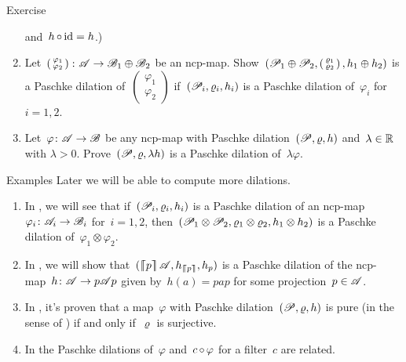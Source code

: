 \begin{parsec}
\begin{point}{Exercise}
\begin{enumerate}
and~$h \mathop{\circ} \operatorname{id} = h$.)
\item
    Let~$ \left(\begin{smallmatrix} \varphi_1 \\ \varphi_2
    \end{smallmatrix}\right) \colon \mathscr{A} \to \mathscr{B}_1 \oplus \mathscr{B}_2$
    be an ncp-map.
Show~$(\mathscr{P}_1 \oplus \mathscr{P}_2,
        \left(\begin{smallmatrix} \varrho_1 \\ \varrho_2 \end{smallmatrix}\right),
        h_1 \oplus h_2)$
        is a Paschke dilation of~$\left(\begin{smallmatrix} \varphi_1 \\ \varphi_2 
        \end{smallmatrix}\right)$
    if~$(\mathscr{P}_i, \varrho_i, h_i)$
    is a Paschke dilation of~$\varphi_i$ for~$i=1,2$.
\item
Let~$\varphi\colon \mathscr{A} \to \mathscr{B}$
    be any ncp-map with Paschke dilation~$(\mathscr{P}, \varrho, h)$
    and~$\lambda \in \mathbb{R}$ with $\lambda > 0$.
Prove~$(\mathscr{P}, \varrho, \lambda h)$
    is a Paschke dilation of~$\lambda \varphi$.
\end{enumerate}
\end{point}
\begin{point}{Examples}%
Later we will be able to compute more dilations.
\begin{enumerate}
\item
In , we will see
    that if~$(\mathscr{P}_i, \varrho_i, h_i)$
    is a Paschke dilation of an ncp-map~$\varphi_i \colon \mathscr{A}_i \to \mathscr{B}_i$
    for~$i=1,2$,
    then~$(\mathscr{P}_1 \otimes \mathscr{P}_2, \varrho_1\otimes \varrho_2, h_1\otimes h_2)$
    is a Paschke dilation of~$\varphi_1 \otimes \varphi_2$.
\item
In , we will
    show that~$(\cceil{p}\scrA, h_{\cceil{p}}, h_p)$
    is a Paschke dilation of the
    ncp-map~$h\colon \mathscr{A} \to p \mathscr{A} p$
    given by~$h(a) = pap$ for some projection~$p\in \mathscr{A}$.
\item
In , it's proven
    that a map~$\varphi$
    with Paschke dilation~$(\mathscr{P}, \varrho, h)$
    is pure (in the sense of )
    if and only if~$\varrho$ is surjective.
\item
In 
    the Paschke dilations of~$\varphi$
    and~$c \mathop{\circ} \varphi$ for a filter~$c$ are related.
\end{enumerate}
\end{point}
\end{parsec}

